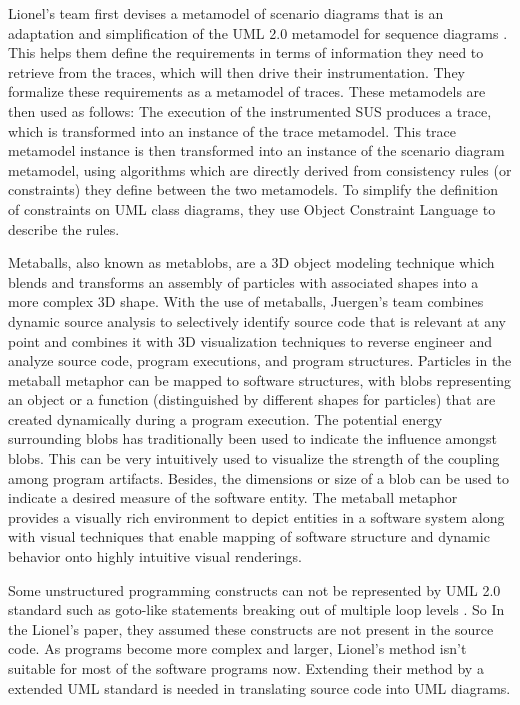 \documentclass[acmsmall]{acmart}
\begin{document}
Lionel's team first devises a metamodel of scenario diagrams that is an adaptation and simplification of the UML 2.0 metamodel for sequence diagrams . This helps them define the requirements in terms of information they need to retrieve from the traces, which will then drive their instrumentation. They formalize these requirements as a metamodel of traces. These metamodels are then used as follows: The execution of the instrumented SUS produces a trace, which is transformed into an instance of the trace metamodel. This trace metamodel instance is then transformed into an instance of the scenario diagram metamodel, using algorithms which are directly derived from consistency rules (or constraints) they define between the two metamodels. To simplify the definition of constraints on UML class diagrams, they use Object Constraint Language to describe the rules.

Metaballs, also known as metablobs, are a 3D object modeling technique which blends and transforms an assembly of particles with associated shapes into a more complex 3D shape. With the use of metaballs,  Juergen's team combines dynamic source analysis to selectively identify source code that is relevant at any point and combines it with 3D visualization techniques to reverse engineer and analyze source code, program executions, and program structures. Particles in the metaball metaphor can be mapped to software structures, with blobs representing an object or a function (distinguished by different shapes for particles) that are created dynamically during a program execution. The potential energy surrounding blobs has traditionally been used to indicate the influence amongst blobs. This can be very intuitively used to visualize the strength of the coupling among program artifacts. Besides, the dimensions or size of a blob can be used to indicate a desired measure of the software entity. The metaball metaphor provides a visually rich environment to depict entities in a software system along with visual techniques that enable mapping of software structure and dynamic behavior onto highly intuitive visual renderings. 


Some unstructured programming constructs can not be represented by UML 2.0 standard such as goto-like statements breaking out of multiple loop levels \cite{2006Toward}. So In the Lionel's paper, they assumed these constructs are not present in the source code. As programs become more complex and larger, Lionel's method isn't suitable for most of the software programs now. Extending their method by a extended UML standard is needed in translating source code into UML diagrams.
\end{document}
